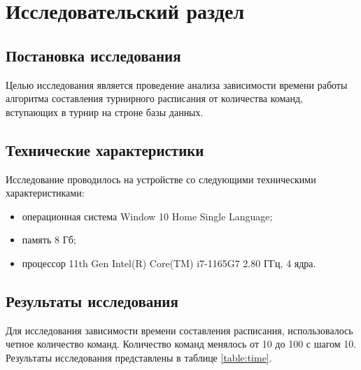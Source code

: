\section{Исследовательский раздел}

\subsection{Постановка исследования}

Целью исследования является проведение анализа зависимости времени работы алгоритма составления турнирного расписания от количества команд, вступающих в турнир на строне базы данных.

\subsection{Технические характеристики}

Исследование проводилось на устройстве со следующими техническими характеристиками:

\begin{itemize}
	\item операционная система Window 10 Home Single Language;
	\item память 8 Гб;
	\item процессор 11th Gen Intel(R) Core(TM) i7-1165G7 2.80 ГГц, 4 ядра.
\end{itemize}

\subsection{Результаты исследования}

Для исследования зависимости времени составления расписания, использовалось четное количество команд. Количество команд менялось от 10 до 100 с шагом 10. Результаты исследования представлены в таблице \ref{table:time}.

